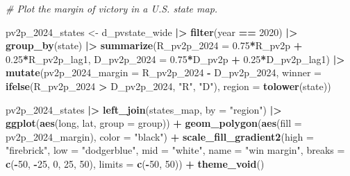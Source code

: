 \documentclass[
]{article}
\newenvironment{Shaded}{\begin{snugshade}}{\end{snugshade}}
\newcommand{\AttributeTok}[1]{\textcolor[rgb]{0.13,0.29,0.53}{#1}}
\newcommand{\CommentTok}[1]{\textcolor[rgb]{0.56,0.35,0.01}{\textit{#1}}}
\newcommand{\DecValTok}[1]{\textcolor[rgb]{0.00,0.00,0.81}{#1}}
\newcommand{\FloatTok}[1]{\textcolor[rgb]{0.00,0.00,0.81}{#1}}
\newcommand{\FunctionTok}[1]{\textcolor[rgb]{0.13,0.29,0.53}{\textbf{#1}}}
\newcommand{\NormalTok}[1]{#1}
\newcommand{\OtherTok}[1]{\textcolor[rgb]{0.56,0.35,0.01}{#1}}
\newcommand{\SpecialCharTok}[1]{\textcolor[rgb]{0.81,0.36,0.00}{\textbf{#1}}}
\newcommand{\StringTok}[1]{\textcolor[rgb]{0.31,0.60,0.02}{#1}}
\begin{document}
\begin{Shaded}
\begin{Highlighting}[]
\CommentTok{\# Plot the margin of victory in a U.S. state map.}

\NormalTok{pv2p\_2024\_states }\OtherTok{\textless{}{-}}\NormalTok{ d\_pvstate\_wide }\SpecialCharTok{|\textgreater{}}
  \FunctionTok{filter}\NormalTok{(year }\SpecialCharTok{==} \DecValTok{2020}\NormalTok{) }\SpecialCharTok{|\textgreater{}}
  \FunctionTok{group\_by}\NormalTok{(state) }\SpecialCharTok{|\textgreater{}}
  \FunctionTok{summarize}\NormalTok{(}\AttributeTok{R\_pv2p\_2024 =} \FloatTok{0.75}\SpecialCharTok{*}\NormalTok{R\_pv2p }\SpecialCharTok{+} \FloatTok{0.25}\SpecialCharTok{*}\NormalTok{R\_pv2p\_lag1,}
            \AttributeTok{D\_pv2p\_2024 =} \FloatTok{0.75}\SpecialCharTok{*}\NormalTok{D\_pv2p }\SpecialCharTok{+} \FloatTok{0.25}\SpecialCharTok{*}\NormalTok{D\_pv2p\_lag1) }\SpecialCharTok{|\textgreater{}}
  \FunctionTok{mutate}\NormalTok{(}\AttributeTok{pv2p\_2024\_margin =}\NormalTok{ R\_pv2p\_2024 }\SpecialCharTok{{-}}\NormalTok{ D\_pv2p\_2024,}
         \AttributeTok{winner =} \FunctionTok{ifelse}\NormalTok{(R\_pv2p\_2024 }\SpecialCharTok{\textgreater{}}\NormalTok{ D\_pv2p\_2024, }\StringTok{"R"}\NormalTok{, }\StringTok{"D"}\NormalTok{),}
         \AttributeTok{region =} \FunctionTok{tolower}\NormalTok{(state))}

\NormalTok{pv2p\_2024\_states }\SpecialCharTok{|\textgreater{}}
  \FunctionTok{left\_join}\NormalTok{(states\_map, }\AttributeTok{by =} \StringTok{"region"}\NormalTok{) }\SpecialCharTok{|\textgreater{}}
  \FunctionTok{ggplot}\NormalTok{(}\FunctionTok{aes}\NormalTok{(long, lat, }\AttributeTok{group =}\NormalTok{ group)) }\SpecialCharTok{+}
  \FunctionTok{geom\_polygon}\NormalTok{(}\FunctionTok{aes}\NormalTok{(}\AttributeTok{fill =}\NormalTok{ pv2p\_2024\_margin), }\AttributeTok{color =} \StringTok{"black"}\NormalTok{) }\SpecialCharTok{+}
  \FunctionTok{scale\_fill\_gradient2}\NormalTok{(}\AttributeTok{high =} \StringTok{"firebrick"}\NormalTok{,}
                      \AttributeTok{low =} \StringTok{"dodgerblue"}\NormalTok{,}
                      \AttributeTok{mid =} \StringTok{"white"}\NormalTok{,}
                      \AttributeTok{name =} \StringTok{"win margin"}\NormalTok{,}
                      \AttributeTok{breaks =} \FunctionTok{c}\NormalTok{(}\SpecialCharTok{{-}}\DecValTok{50}\NormalTok{, }\SpecialCharTok{{-}}\DecValTok{25}\NormalTok{, }\DecValTok{0}\NormalTok{, }\DecValTok{25}\NormalTok{, }\DecValTok{50}\NormalTok{),}
                      \AttributeTok{limits =} \FunctionTok{c}\NormalTok{(}\SpecialCharTok{{-}}\DecValTok{50}\NormalTok{, }\DecValTok{50}\NormalTok{)) }\SpecialCharTok{+}
  \FunctionTok{theme\_void}\NormalTok{()}
\end{Highlighting}
\end{Shaded}
\end{document}
